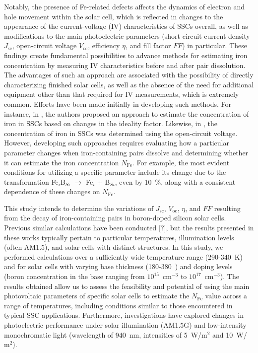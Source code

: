 \documentclass[a4paper,fleqn]{cas-sc}
\begin{document}
Notably, the presence of Fe-related defects affects the dynamics of electron and hole movement within the solar cell, which is reflected in changes to the appearance of the current-voltage (IV) characteristics of SSCs overall, as well as modifications to the main photoelectric parameters (short-circuit current density $J$$\mathrm{_{sc}}$, open-circuit voltage $V$$\mathrm{_{oc}}$, efficiency $\eta$, and fill factor $FF$) in particular. These findings create fundamental possibilities to advance methods for estimating iron concentration by measuring IV characteristics before and after pair dissolution. The advantages of such an approach are associated with the possibility of directly characterizing finished solar cells, as well as the absence of the need for additional equipment other than that required for IV measurements, which is extremely common. Efforts have been made initially in developing such methods. For instance, in \cite{Olikh2019}, the authors proposed an approach to estimate the concentration of iron in SSCs based on changes in the ideality factor. Likewise, in \cite{Herguth2022}, the concentration of iron in SSCs was determined using the open-circuit voltage. However, developing such approaches requires evaluating how a particular parameter changes when iron-containing pairs dissolve and determining whether it can estimate the iron concentration $N$$\mathrm{_{Fe}}$. For example, the most evident conditions for utilizing a specific parameter include its change due to the transformation  Fe$_i$B$_{Si}$ $\rightarrow$ Fe$_i$ + B$_{Si}$, even by 10~\%, along with a consistent dependence of these changes on $N$$\mathrm{_{Fe}}$.


This study intends to determine the variations of $J$$\mathrm{_{sc}}$, $V$$\mathrm{_{oc}}$, $\eta$, and $FF$ resulting from the decay of iron-containing pairs in boron-doped silicon solar cells. Previous similar calculations have been conducted [?], but the results presented in these works typically pertain to particular temperatures, illumination levels (often AM1.5), and solar cells with distinct structures. In this study, we performed calculations over a sufficiently wide temperature range (290-340~$\mathrm{K}$) and for solar cells with varying base thickness (180-380~\textnormal{\textmu}) and doping levels (boron concentration in the base ranging from $\mathrm{10}^{15}$~$\mathrm{cm}^{-3}$ to $\mathrm{10}^{17}$~$\mathrm{cm}^{-3}$). The results obtained allow us to assess the feasibility and potential of using the main photovoltaic parameters of specific solar cells to estimate the $N$$\mathrm{_{Fe}}$ value across a range of temperatures, including conditions similar to those encountered in typical SSC applications. Furthermore, investigations have explored changes in photoelectric performance under solar illumination (AM1.5G) and low-intensity monochromatic light (wavelength of 940~$\mathrm{nm}$, intensities of 5~W/$\mathrm{m}^{2}$ and 10~W/$\mathrm{m}^{2}$).
\end{document}

